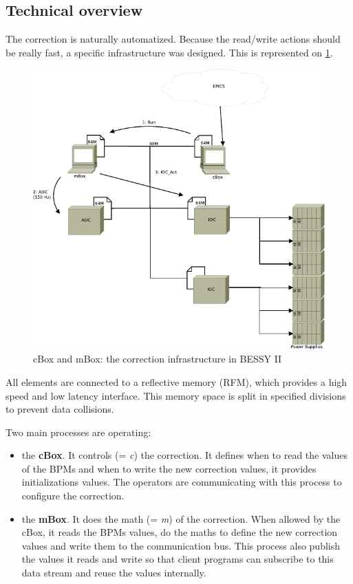 \subsection{Technical overview}

The correction is naturally automatized. Because the read/write actions should be really fast, a specific infrastructure was designed. This is represented on \cref{fig:cbox_mbox}. 

\begin{figure}[!h]
    \centering
    \includegraphics[width=.85\linewidth]{img/mBox_cBox}
    \caption{\label{fig:cbox_mbox}cBox and mBox: the correction infrastructure in BESSY II}
\end{figure}

All elements are connected to a reflective memory (RFM), which provides a high speed and low latency interface. This memory space is split in specified divisions to prevent data collisions.

Two main processes are operating:
\begin{itemize}
    \item the \textbf{cBox}. It controls (= \textit{c}) the correction. It defines when to read the values of the BPMs and when to write the new correction values, it provides initializations values. The operators are communicating with this process to configure the correction.
    \item the \textbf{mBox}. It does the math (= \textit{m}) of the correction. When allowed by the cBox, it reads the BPMs values, do the maths to define the new correction values and write them to the communication bus. This process also publish the values it reads and write so that client programs can subscribe to this data stream and reuse the values internally.
\end{itemize}

